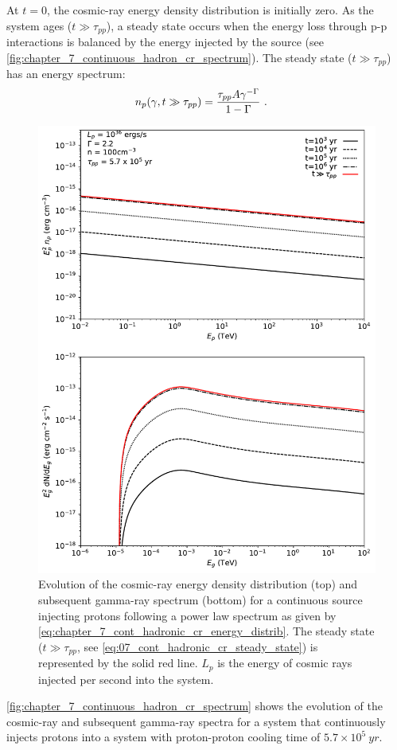 At $t=0$, the cosmic-ray energy density distribution is initially zero. As the system ages ($t\gg\tau_{pp}$), a steady state occurs when the energy loss through p-p interactions is balanced by the energy injected by the source (see \autoref{fig:chapter_7_continuous_hadron_cr_spectrum}). The steady state ($t\gg \tau_{pp}$) has an energy spectrum:
\begin{equation}
    \begin{aligned}
    	n_p\qty(\gamma, t\gg \tau_{pp})&=\frac{\tau_{pp}A\gamma^{-\Gamma}}{1-\Gamma}\text{ .}
    \end{aligned} \label{eq:07_cont_hadronic_cr_steady_state}
\end{equation}
\begin{figure}[hbtp]
	\centering
	\includegraphics[width=1.0\textwidth]{07_Particle_Evolution/Images/evolution/continuous_proton_total_spectrum.pdf}
	\caption{Evolution of the cosmic-ray energy density distribution (top) and subsequent gamma-ray spectrum (bottom) for a continuous source injecting protons following a power law spectrum as given by \autoref{eq:chapter_7_cont_hadronic_cr_energy_distrib}. The steady state ($t\gg \tau_{pp}$, see \autoref{eq:07_cont_hadronic_cr_steady_state}) is represented by the solid red line. $L_p$ is the energy of cosmic rays injected per second into the system.}
	\label{fig:chapter_7_continuous_hadron_cr_spectrum}
\end{figure}
\autoref{fig:chapter_7_continuous_hadron_cr_spectrum} shows the evolution of the cosmic-ray and subsequent gamma-ray spectra for a system that continuously injects protons into a system with proton-proton cooling time of $5.7\times 10^5~\si{yr}$.

